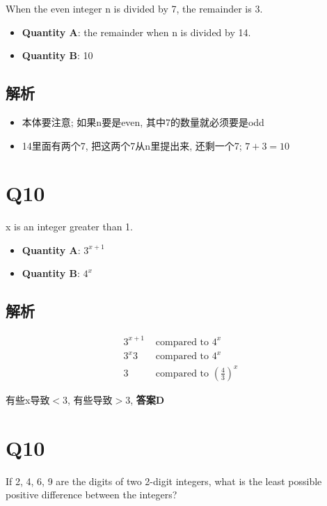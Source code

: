   When the even integer n is divided by 7, the remainder is 3.

  \begin{itemize}
    \item \textbf{Quantity A}: the remainder when n is divided by 14.
    \item \textbf{Quantity B}: 10
  \end{itemize}

  \subsection{解析}

    \begin{itemize}
      \item 本体要注意; 如果n要是even, 其中7的数量就必须要是odd
      \item 14里面有两个7, 把这两个7从n里提出来, 还剩一个7; $ 7 + 3 = 10 $
    \end{itemize}

\section{Q10}

  x is an integer greater than 1.

  \begin{itemize}
    \item \textbf{Quantity A}: $ 3^{x + 1} $
    \item \textbf{Quantity B}: $ 4^{x} $
  \end{itemize}

  \subsection{解析}

    \begin{align*}
      3^{x + 1} &\text{ compared to } 4^{x} \\
      3^{x} 3 &\text{ compared to } 4^{x} \\
      3 &\text{ compared to } \left( \frac{4}{3} \right)^{x}
    \end{align*}

    有些x导致$ < 3 $, 有些导致$ > 3 $, \textbf{答案D}

\section{Q10}

  If 2, 4, 6, 9 are the digits of two 2-digit integers, what is the least
  possible positive difference between the integers?

